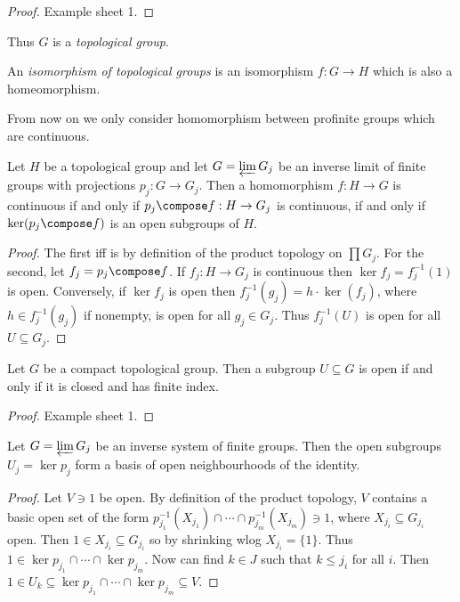 \documentclass[a4paper]{article}
\begin{document}
\begin{proof}
  Example sheet 1.
\end{proof}

Thus \(G\) is a \emph{topological group}.

\begin{definition}
  An \emph{isomorphism of topological groups} is an isomorphism \(f: G \to H\) which is also a homeomorphism.
\end{definition}

From now on we only consider homomorphism between profinite groups which are continuous.

\begin{lemma}
  Let \(H\) be a topological group and let \(G = \varprojlim G_j\) be an inverse limit of finite groups with projections \(p_j: G \to G_j\). Then a homomorphism \(f: H \to G\) is continuous if and only if \(p_j \compose f: H \to G_j\) is continuous, if and only if \(\ker(p_j \compose f)\) is an open subgroups of \(H\).
\end{lemma}

\begin{proof}
  The first iff is by definition of the product topology on \(\prod G_j\). For the second, let \(f_j = p_j \compose f\). If \(f_j: H \to G_j\) is continuous then \(\ker f_j = f_j^{-1}(1)\) is open. Conversely, if \(\ker f_j\) is open then \(f_j^{-1}(g_j) = h \cdot \ker(f_j)\), where \(h \in f_j^{-1}(g_j)\) if nonempty, is open for all \(g_j \in G_j\). Thus \(f_j^{-1}(U)\) is open for all \(U \subseteq G_j\).
\end{proof}

\begin{proposition}
  Let \(G\) be a compact topological group. Then a subgroup \(U \subseteq G\) is open if and only if it is closed and has finite index.
\end{proposition}

\begin{proof}
  Example sheet 1.
\end{proof}

\begin{proposition}
  Let \(G = \varprojlim G_j\) be an inverse system of finite groups. Then the open subgroups \(U_j = \ker p_j\) form a basis of open neighbourhoods of the identity.
\end{proposition}

\begin{proof}
  Let \(V \ni 1\) be open. By definition of the product topology, \(V\) contains a basic open set of the form \(p_{j_1}^{-1}(X_{j_1}) \cap \cdots \cap p_{j_m}^{-1}(X_{j_m}) \ni 1\), where \(X_{j_i} \subseteq G_{j_i}\) open. Then \(1 \in X_{j_i} \subseteq G_{j_i}\) so by shrinking wlog \(X_{j_i} = \{1\}\). Thus \(1 \in \ker p_{j_1} \cap \cdots \cap \ker p_{j_m}\). Now can find \(k \in J\) such that \(k \leq j_i\) for all \(i\). Then \(1 \in U_k \subseteq \ker p_{j_1} \cap \cdots \cap \ker p_{j_m} \subseteq V\).
\end{proof}
\end{document}
